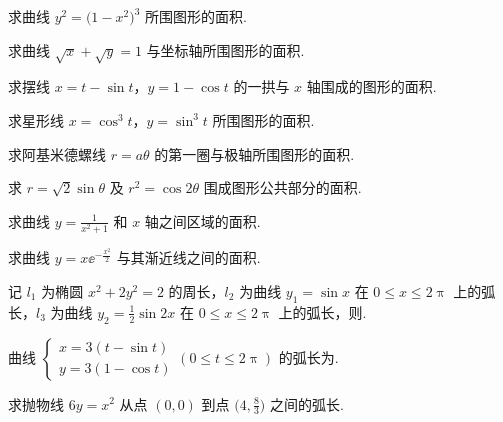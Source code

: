 	\begin{ti}
		求曲线 $y^{2} = \bigl( 1 - x^{2} \bigr)^{3}$ 所围图形的面积.
	\end{ti}

	\begin{ti}
		求曲线 $\sqrt{x} + \sqrt{y} = 1$ 与坐标轴所围图形的面积.
	\end{ti}

	\begin{ti}
		求摆线 $x = t - \sin t$，$y = 1 - \cos t$ 的一拱与 $x$ 轴围成的图形的面积.
	\end{ti}

	\begin{ti}
		求星形线 $x = \cos^{3}t$，$y = \sin^{3}t$ 所围图形的面积.
	\end{ti}

	\begin{ti}
		求阿基米德螺线 $r = a \theta$ 的第一圈与极轴所围图形的面积.
	\end{ti}

	\begin{ti}
		求 $r = \sqrt{2} \sin \theta$ 及 $r^{2} = \cos 2 \theta$ 围成图形公共部分的面积.
	\end{ti}

	\begin{ti}
		求曲线 $y = \frac{1}{x^{2} + 1}$ 和 $x$ 轴之间区域的面积.
	\end{ti}

	\begin{ti}
		求曲线 $y = x \ee^{-\frac{x^{2}}{2}}$ 与其渐近线之间的面积.
	\end{ti}

	\begin{ti}
		记 $l_{1}$ 为椭圆 $x^{2} + 2y^{2} = 2$ 的周长，$l_{2}$ 为曲线 $y_{1} = \sin x$ 在 $0 \leq x \leq 2\uppi$ 上的弧长，$l_{3}$ 为曲线 $y_{2} = \frac{1}{2} \sin 2x$ 在 $0 \leq x \leq 2\uppi$ 上的弧长，则\kuo.

	\end{ti}

	\begin{ti}
		曲线 $\begin{cases}
			x = 3 (t - \sin t)\\
			y = 3 (1 - \cos t)
		\end{cases} (0 \leq t \leq 2\uppi)$ 的弧长为\htwo.
	\end{ti}

	\begin{ti}
		求抛物线 $6y = x^{2}$ 从点 $(0,0)$ 到点 $\bigl( 4,\frac{8}{3} \bigr)$ 之间的弧长.
	\end{ti}

